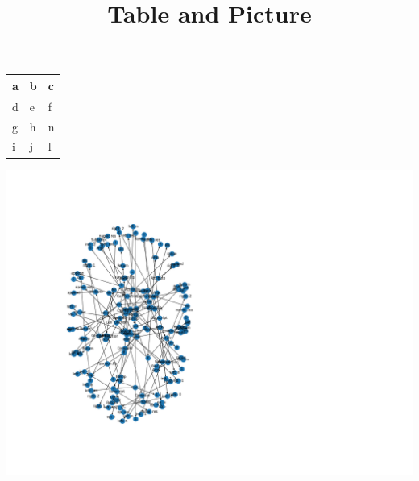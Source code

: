 \documentclass{article}
\title{Table and Picture}
\begin{document}
\maketitle
\begin{tabular}{ | l | l | l | }
\hline
a & b & c\\ \hline
d & e & f\\ \hline
g & h & n\\ \hline
i & j & l\\ \hline
\end{tabular}
\includegraphics[scale=0.3]{graph.png}
\end{document}
